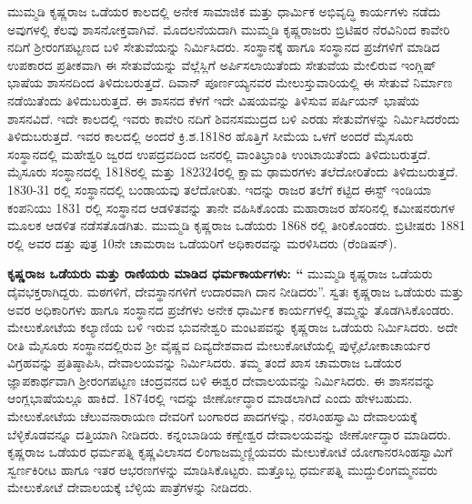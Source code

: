 ಮುಮ್ಮಡಿ ಕೃಷ್ಣರಾಜ ಒಡೆಯರ ಕಾಲದಲ್ಲಿ ಅನೇಕ ಸಾಮಾಜಿಕ ಮತ್ತು ಧಾರ್ಮಿಕ ಅಭಿವೃದ್ಧಿ ಕಾರ್ಯಗಳು ನಡೆದು ಅವುಗಳಲ್ಲಿ ಕೆಲವು ಶಾಸನೋಕ್ತವಾಗಿವೆ. ಮೊದಲನೆಯದಾಗಿ ಮುಮ್ಮಡಿ ಕೃಷ್ಣರಾಜರು ಬ್ರಿಟಿಷರ ನೆರವಿನಿಂದ ಕಾವೇರಿ ನದಿಗೆ ಶ‍್ರೀರಂಗಪಟ್ಟಣದ ಬಳಿ ಸೇತುವೆಯನ್ನು ನಿರ್ಮಿಸಿದರು. ಸಂಸ್ಥಾನಕ್ಕೆ ಹಾಗೂ ಸಂಸ್ಥಾನದ ಪ್ರಜೆಗಳಿಗೆ ಮಾಡಿದ ಉಪಕಾರದ ಪ್ರತೀಕವಾಗಿ ಈ ಸೇತುವೆಯನ್ನು ವೆಲ್ಲೆಸ್ಲಿಗೆ ಅರ್ಪಿಸಲಾಯಿತೆಂದು ಸೇತುವೆಯ ಮೇಲಿರುವ ಇಂಗ್ಲಿಷ್​ ಭಾಷೆಯ ಶಾಸನದಿಂದ ತಿಳಿದುಬರುತ್ತದೆ. ದಿವಾನ್​ ಪೂರ್ಣಯ್ಯನವರ ಮೇಲುಸ್ತುವಾರಿಯಲ್ಲಿ ಈ ಸೇತುವೆ ನಿರ್ಮಾಣ ನಡೆಯಿತೆಂದು ತಿಳಿದು\-ಬರುತ್ತದೆ. ಈ ಶಾಸನದ ಕೆಳಗೆ ಇದೇ ವಿಷಯವನ್ನು ತಿಳಿಸುವ ಪರ್ಷಿಯನ್​ ಭಾಷೆಯ ಶಾಸನವಿದೆ. ಇದೇ ಕಾಲದಲ್ಲಿ ಇವರು ಕಾವೇರಿ ನದಿಗೆ ಶಿವನಸಮುದ್ರದ ಬಳಿ ಎರಡು ಸೇತುವೆಗಳನ್ನು ನಿರ್ಮಿಸಿದರೆಂದು ತಿಳಿದುಬರುತ್ತದೆ. ಇವರ ಕಾಲದಲ್ಲಿ ಅಂದರೆ ಕ್ರಿ.ಶ.1818ರ ಹೊತ್ತಿಗೆ ಸೀಮೆಯ ಒಳಗೆ ಅಂದರೆ ಮೈಸೂರು ಸಂಸ್ಥಾನದಲ್ಲಿ ಮಹೇಶ್ವರಿ ಜ್ವರದ ಉಪದ್ರವದಿಂದ ಜನರಲ್ಲಿ ವಾಂತಿಭ್ರಾಂತಿ ಉಂಟಾಯಿತೆಂದು ತಿಳಿದುಬರುತ್ತದೆ. ಮೈಸೂರು ಸಂಸ್ಥಾನದಲ್ಲಿ 1818ರಲ್ಲಿ ಮತ್ತು 1823\enginline{-}24ರಲ್ಲಿ ಕ್ಷಾಮ ಢಾಮರಗಳು ತಲೆದೋರಿತೆಂದು ತಿಳಿದುಬರುತ್ತದೆ. 1830-31 ರಲ್ಲಿ ಸಂಸ್ಥಾನದಲ್ಲಿ ಬಂಡಾಯವು ತಲೆದೋರಿತು. ಇದನ್ನು ರಾಜರ ತಲೆಗೆ ಕಟ್ಟಿದ ಈಸ್ಟ್ ಇಂಡಿಯಾ ಕಂಪನಿಯು 1831 ರಲ್ಲಿ ಸಂಸ್ಥಾನದ ಆಡಳಿತವನ್ನು ತಾನೇ ವಹಿಸಿಕೊಂಡು ಮಹಾರಾಜರ ಹೆಸರಿನಲ್ಲಿ ಕಮೀಷನರುಗಳ ಮೂಲಕ ಆಡಳಿತ ನಡೆಸತೊಡಗಿತು. ಮುಮ್ಮಡಿ ಕೃಷ್ಣರಾಜ ಒಡೆಯರು 1868 ರಲ್ಲಿ ತೀರಿ\-ಕೊಂಡರು. ಬ್ರಿಟೀಷರು 1881 ರಲ್ಲಿ ಅವರ ದತ್ತು ಪುತ್ರ 10ನೇ ಚಾಮರಾಜ ಒಡೆಯರಿಗೆ ಅಧಿಕಾರವನ್ನು ಮರಳಿಸಿದರು (ರೆಂಡಿಷನ್).

\textbf{ ಕೃಷ್ಣರಾಜ ಒಡೆಯರು ಮತ್ತು ರಾಣಿಯರು ಮಾಡಿದ ಧರ್ಮಕಾರ್ಯಗಳು: “} ಮುಮ್ಮಡಿ ಕೃಷ್ಣರಾಜ ಒಡೆಯರು ದೈವಭಕ್ತರಾಗಿದ್ದರು. ಮಠಗಳಿಗೆ, ದೇವಸ್ಥಾನಗಳಿಗೆ ಉದಾರವಾಗಿ ದಾನ ನೀಡಿದರು”. ಸ್ವತಃ ಕೃಷ್ಣರಾಜ ಒಡೆಯರು ಮತ್ತು ಅವರ ಅಧಿಕಾರಿಗಳು ಹಾಗೂ ಸಂಸ್ಥಾನದ ಪ್ರಜೆಗಳು ಅನೇಕ ಧಾರ್ಮಿಕ ಕಾರ್ಯಗಳಲ್ಲಿ ತಮ್ಮನ್ನು ತೊಡಗಿಸಿಕೊಂಡರು. ಮೇಲುಕೋಟೆಯ ಕಲ್ಯಾಣಿಯ ಬಳಿ ಇರುವ ಭುವನೇಶ್ವರಿ ಮಂಟಪವನ್ನು ಕೃಷ್ಣರಾಜ ಒಡೆಯರು ನಿರ್ಮಿಸಿದರು. ಅದೇ ರೀತಿ ಮೈಸೂರು ಸಂಸ್ಥಾನದಲ್ಲಿರುವ ಶ‍್ರೀ ವೈಷ್ಣವ ದಿವ್ಯದೇಶವಾದ ಮೇಲುಕೋಟೆಯಲ್ಲಿ ಪುಳ್ಳೈಲೋಕಾಚಾರ್ಯರ ವಿಗ್ರಹವನ್ನು ಪ್ರತಿಷ್ಠಾಪಿಸಿ, ದೇವಾಲಯವನ್ನು ನಿರ್ಮಿಸಿದರು. ತಮ್ಮ ತಂದೆ ಖಾಸ ಚಾಮರಾಜ ಒಡೆಯರ ಜ್ಞಾಪಕಾರ್ಥ\-ವಾಗಿ ಶ‍್ರೀರಂಗಪಟ್ಟಣ ಚಂದ್ರವನದ ಬಳಿ ಈಶ್ವರ ದೇವಾಲಯವನ್ನು ನಿರ್ಮಿಸಿದರು. ಈ ಶಾಸನವನ್ನು ಆಂಗ್ಲಭಾಷೆ\-ಯಲ್ಲೂ ಹಾಕಿದೆ. 1874ರಲ್ಲಿ ಇದನ್ನು ಜೀರ್ಣೋದ್ಧಾರ ಮಾಡಲಾಗಿದೆ ಎಂದು ಹೇಳಬಹುದು. ಮೇಲುಕೋಟೆಯ ಚೆಲುವನಾರಾಯಣ ದೇವರಿಗೆ ಬಂಗಾರದ ಪಾದಗಳನ್ನು, ನರಸಿಂಹಸ್ವಾಮಿ ದೇವಾಲಯಕ್ಕೆ ಬೆಳ್ಳಿಕೊಡವನ್ನೂ ದತ್ತಿಯಾಗಿ ನೀಡಿದರು. ಕನ್ನಂಬಾಡಿಯ ಕಣ್ವೇಶ್ವರ ದೇವಾಲಯವನ್ನು ಜೀರ್ಣೋದ್ಧಾರ ಮಾಡಿದರು. ಕೃಷ್ಣರಾಜ ಒಡೆಯರ ಧರ್ಮಪತ್ನಿ ಕೃಷ್ಣವಿಲಾಸದ ಲಿಂಗಾಜಮ್ಮಣ್ಣಿಯವರು ಮೇಲುಕೋಟೆ ಯೋಗಾನರಸಿಂಹಸ್ವಾಮಿಗೆ ಸ್ವರ್ಣಕಿರೀಟ ಹಾಗೂ ಇತರ ಆಭರಣಗಳನ್ನು ಮಾಡಿಸಿಕೊಟ್ಟರು. ಮತ್ತೊಬ್ಬ ಧರ್ಮಪತ್ನಿ ಮುದ್ದುಲಿಂಗಮ್ಮನವರು ಮೇಲುಕೋಟೆ ದೇವಾಲಯಕ್ಕೆ ಬೆಳ್ಳಿಯ ಪಾತ್ರೆಗಳನ್ನು ನೀಡಿದರು.

